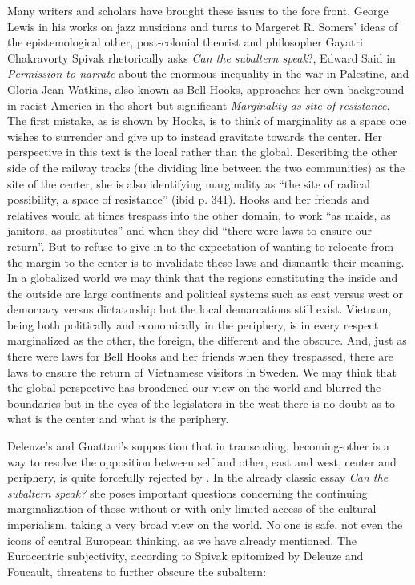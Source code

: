 \documentclass[a4paper]{article}
\begin{document}
Many writers and scholars have brought these issues to the fore front. George Lewis in his works on jazz musicians and turns to Margeret R. Somers' ideas of the epistemological other, post-colonial theorist and philosopher Gayatri Chakravorty Spivak rhetorically asks \emph{Can the subaltern speak}?, Edward Said in \emph{Permission to narrate} about the enormous inequality in the war in Palestine, and Gloria Jean Watkins, also known as Bell Hooks, approaches her own background in racist America in the short but significant \emph{Marginality as site of resistance}\cite{HooksBell1990}. The first mistake, as is shown by Hooks, is to think of marginality as a space one wishes to surrender and give up to instead gravitate towards the center. Her perspective in this text is the local rather than the global. Describing the other side of the railway tracks (the dividing line between the two communities) as the site of the center, she is also identifying marginality as ``the site of radical possibility, a space of resistance'' (ibid p. 341). Hooks and her friends and relatives would at times trespass into the other domain, to work ``as maids, as janitors, as prostitutes'' and when they did ``there were laws to ensure our return''. But to refuse to give in to the expectation of wanting to relocate from the margin to the center is to invalidate these laws and dismantle their meaning. In a globalized world we may think that the regions constituting the inside and the outside are large continents and political systems such as east versus west or democracy versus dictatorship but the local demarcations still exist. Vietnam, being both politically and economically in the periphery, is in every respect marginalized as the other, the foreign, the different and the obscure. And, just as there were laws for Bell Hooks and her friends when they trespassed, there are laws to ensure the return of Vietnamese visitors in Sweden. We may think that the global perspective has broadened our view on the world and blurred the boundaries but in the eyes of the legislators in the west there is no doubt as to what is the center and what is the periphery. 

Deleuze's and Guattari's supposition that in transcoding, becoming-other is a way to resolve the opposition between self and other, east and west, center and periphery, is quite forcefully rejected by  \citet{spivak1988}. In the already classic essay \emph{Can the subaltern speak?} she poses important questions concerning the continuing marginalization of those without or with only limited access of the cultural imperialism, taking a very broad view on the world. No one is safe, not even the icons of central European thinking, as we have already mentioned. The Eurocentric subjectivity, according to Spivak epitomized by Deleuze and Foucault, threatens to further obscure the subaltern:
\end{document}
